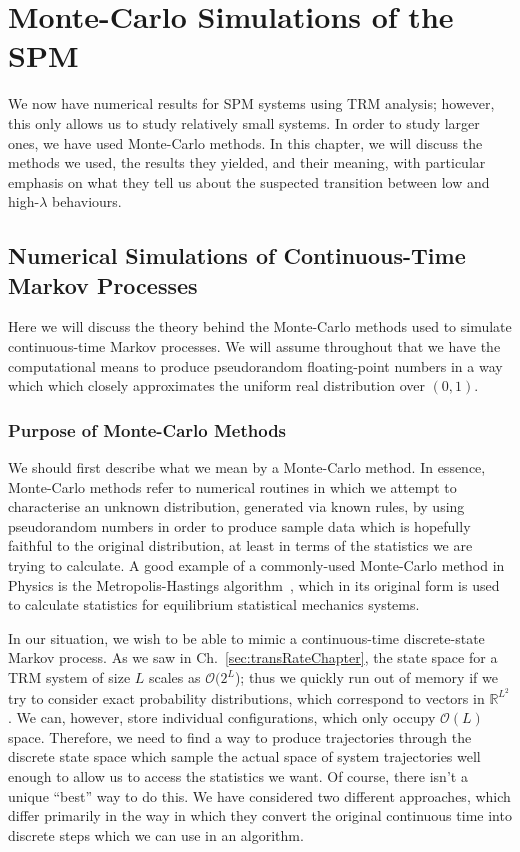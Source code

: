 \chapter{Monte-Carlo Simulations of the SPM} 
\label{sec:numerics}
We now have numerical results for SPM systems using TRM analysis; however, this only allows us to study
relatively small systems. In order to study larger ones, we have used Monte-Carlo methods. In this
chapter, we will discuss the methods we used, the results they yielded, and their meaning, with 
particular emphasis on what they tell us about the suspected transition between low and high-$\lambda$
behaviours.
\section{Numerical Simulations of Continuous-Time Markov Processes}
Here we will discuss the theory behind the Monte-Carlo methods used to simulate continuous-time Markov
processes. We will assume throughout that we have the computational means to produce pseudorandom
floating-point numbers in a way which which closely approximates the uniform real distribution over $(0, 1)$.
\subsection{Purpose of Monte-Carlo Methods}
We should first describe what we mean by a Monte-Carlo method. In essence, Monte-Carlo methods
refer to numerical routines in which we attempt to characterise an unknown distribution, generated 
via known rules, by using
pseudorandom numbers in order to produce sample data which is hopefully faithful to the original 
distribution, at least in terms of the statistics we are trying to calculate. A good example of a
commonly-used Monte-Carlo method in Physics is the Metropolis-Hastings algorithm~\cite{metHastAlg}, which in its original
form is used to calculate statistics for equilibrium statistical mechanics systems.

In our situation, we wish to be able to mimic a continuous-time discrete-state Markov process.
As we saw in Ch.~\ref{sec:transRateChapter}, the state space for a TRM system of size $L$
scales as
$\mathcal{O}(2^L$); thus we quickly run out of memory if we try to consider exact probability distributions, which correspond to
vectors in $\mathbb{R}^{L^2}$. We can, however, store individual configurations, which only occupy
$\mathcal{O}(L)$ space. Therefore, we need to find a way to produce trajectories through the discrete
state space which sample the actual space of system trajectories well enough to allow us to access the
statistics we want. Of course, there isn't a unique ``best'' way to do this. We have considered two
different approaches, which differ primarily in the way in which they convert the original continuous 
time into discrete steps which we can use in an algorithm.


